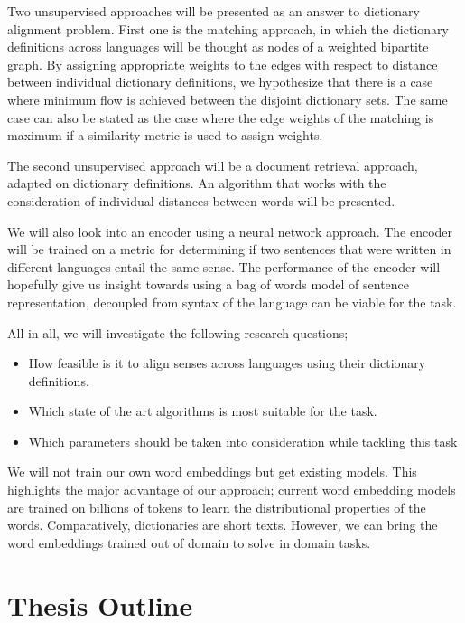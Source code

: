 Two unsupervised approaches will be presented as an answer to dictionary alignment problem.
First one is the matching approach, in which the dictionary definitions across languages will be thought as nodes of a weighted bipartite graph.
By assigning appropriate weights to the edges with respect to distance between individual dictionary definitions, we hypothesize that there is a case where minimum flow is achieved between the disjoint dictionary sets.
The same case can also be stated as the case where the edge weights of the matching is maximum if a similarity metric is used to assign weights.

The second unsupervised approach will be a document retrieval approach, adapted on dictionary definitions.
An algorithm that works with the consideration of individual distances between words will be presented.

We will also look into an encoder using a neural network approach.
The encoder will be trained on a metric for determining if two sentences that were written in different languages entail the same sense.
The performance of the encoder will hopefully give us insight towards using a bag of words model of sentence representation, decoupled from syntax of the language can be viable for the task.

All in all, we will investigate the following research questions;
\begin{itemize}
    \item How feasible is it to align senses across languages using their dictionary definitions.
    \item Which state of the art algorithms is most suitable for the task.
    \item Which parameters should be taken into consideration while tackling this task
\end{itemize}

We will not train our own word embeddings but get existing models.
This highlights the major advantage of our approach;
current word embedding models are trained on billions of tokens to learn the distributional properties of the words.
Comparatively, dictionaries are short texts.
However, we can bring the word embeddings trained out of domain to solve in domain tasks.

\section{Thesis Outline}%
\label{sec:thesis_outline}

